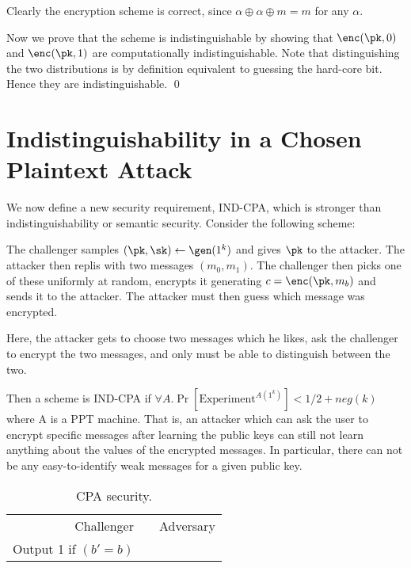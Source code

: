 \proof
Clearly the encryption scheme is correct, since $\alpha \oplus \alpha \oplus m = m$ for any $\alpha$.

Now we  prove  that the scheme is indistinguishable by showing that $\enc(\pk, 0)$ and $\enc(\pk, 1)$
are computationally indistinguishable. Note that distinguishing the two distributions is by definition equivalent to guessing the hard-core bit.
Hence they are indistinguishable.
\qed



\section{Indistinguishability in a Chosen Plaintext Attack}

We now define a new security requirement, IND-CPA, which is stronger than indistinguishability
or semantic security. Consider the following scheme:

The challenger samples $(\pk, \sk) \gets \gen(1^k)$  and gives $\pk$ to the attacker.
The attacker then replis with two messages $(m_0, m_1)$. The challenger then picks
one of these uniformly at random, encrypts it generating $c = \enc(\pk, m_b)$ and sends
it to the attacker. The attacker must then guess which message was encrypted.

Here, the attacker gets to choose two messages which he likes, ask the challenger to
encrypt the two messages, and only must be able to distinguish between the two.

Then a scheme is IND-CPA if $\forall A . \Pr[\text{Experiment}^{A(1^k)}] < 1/2+neg(k)$ where
A is a PPT machine. That is,
an attacker which can ask the user to encrypt specific messages after learning the
public keys can still not learn anything about the values of the encrypted messages. In
particular, there can not be any easy-to-identify weak messages for a given public key.

\begin{table}[ht]
    \centering
    \begin{tabular}{r c l}
        Challenger           &  & Adversary \\
        Output 1 if $(b'=b)$ &  &           \\
    \end{tabular}
    \caption{CPA security.}\label{tab:cpa}
\end{table}


